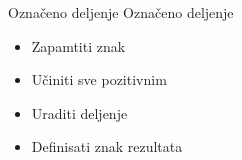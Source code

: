 
\begin{frame}[label=05-s055]{Označeno deljenje}
Označeno deljenje
\begin{itemize}\item Zapamtiti znak\item Učiniti sve pozitivnim\item Uraditi deljenje\item Definisati znak rezultata\end{itemize}
\vspace{3mm}
\end{frame}
